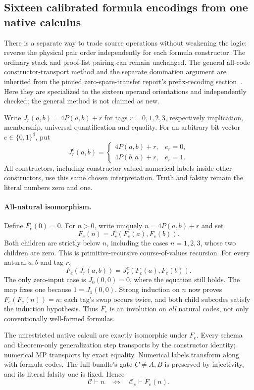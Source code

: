 \subsection{Sixteen calibrated formula encodings from one native calculus}
\label{sec:constructor-orientation}
There is a separate way to trade source operations without weakening the
logic: reverse the physical pair order independently for each formula
constructor.  The ordinary stack and proof-list pairing can remain unchanged.
The general all-code constructor-transport method and the separate
domination argument are inherited from the pinned zero-spare-transfer
report's prefix-recoding section~\cite{recoding}.  Here they are specialized to the
sixteen operand orientations and independently checked; the general
method is not claimed as new.

Write $J_r(a,b)=4P(a,b)+r$ for tags $r=0,1,2,3$, respectively implication,
membership, universal quantification and equality.  For an arbitrary bit
vector $e\in\{0,1\}^4$, put
\[
 J^e_r(a,b)=
 \begin{cases}
 4P(a,b)+r,&e_r=0,\\
 4P(b,a)+r,&e_r=1.
 \end{cases}
\]
All constructors, including constructor-valued numerical labels inside
other constructors, use this same chosen interpretation.  Truth and falsity
remain the literal numbers zero and one.

\paragraph{All-natural isomorphism.}
Define $F_e(0)=0$.  For $n>0$, write uniquely $n=4P(a,b)+r$ and set
\[
 F_e(n)=J^e_r(F_e(a),F_e(b)).
\]
Both children are strictly below $n$, including the cases $n=1,2,3$,
whose two children are zero.  This is primitive-recursive
course-of-values recursion.  For every natural $a,b$ and tag $r$,
\[
 F_e(J_r(a,b))=J^e_r(F_e(a),F_e(b)).
\]
The only zero-input case is $J_0(0,0)=0$, where the equation still holds.
The map fixes one because $1=J_1(0,0)$.  Strong induction on $n$ now proves
$F_e(F_e(n))=n$: each tag's swap occurs twice, and both child subcodes
satisfy the induction hypothesis.  Thus $F_e$ is an involution on
\emph{all} natural codes, not only conventionally well-formed formulas.

The unrestricted native calculi are exactly isomorphic under $F_e$.
Every schema and theorem-only generalization step transports by the
constructor identity; numerical MP transports by exact equality.
Numerical labels transform along with formula codes.  The full bundle's
gate $C\ne A,B$ is preserved by injectivity, and its literal falsity one
is fixed.  Hence
\[
 \mathcal C\vdash n\quad\Longleftrightarrow\quad
 \mathcal C_e\vdash F_e(n).
\]

